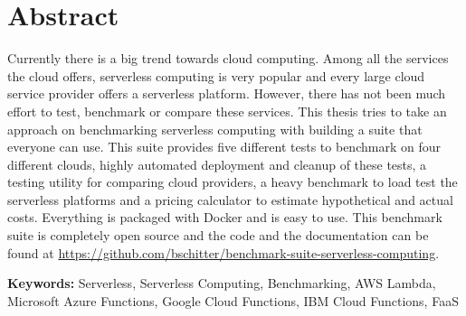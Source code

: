 
\section{Abstract}
Currently there is a big trend towards cloud computing. Among all the services the cloud offers, serverless computing is very popular and every large cloud service provider offers a serverless platform. However, there has not been much effort to test, benchmark or compare these services. This thesis tries to take an approach on benchmarking serverless computing with building a suite that everyone can use.
\newline
This suite provides five different tests to benchmark on four different clouds, highly automated deployment and cleanup of these tests, a testing utility for comparing cloud providers, a heavy benchmark to load test the serverless platforms and a pricing calculator to estimate hypothetical and actual costs. Everything is packaged with Docker and is easy to use.
\newline
This benchmark suite is completely open source and the code and the documentation can be found at \url{https://github.com/bschitter/benchmark-suite-serverless-computing}.

\textbf{Keywords:} Serverless, Serverless Computing, Benchmarking, \gls{AWS} Lambda, Microsoft Azure Functions, Google Cloud Functions, \gls{IBM} Cloud Functions, \gls{FaaS}